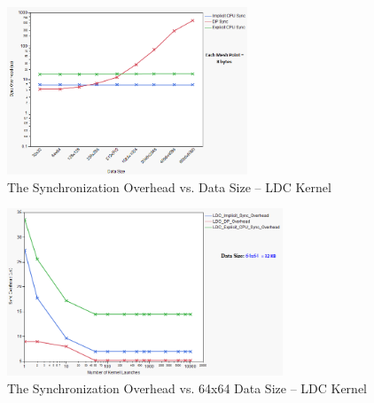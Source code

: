 \documentclass[conference]{IEEEtran}
\begin{document}
\begin{figure}
	\includegraphics[width=1.0\columnwidth, height=5cm]{data_size_vs_sync_overhead.png}
	\caption{The Synchronization Overhead vs. Data Size -- LDC Kernel}
	\label{fig:sync_vs_data_size}
\end{figure}
\begin{figure}
	\includegraphics[width=1.0\columnwidth, height=5cm]{ldc_sync_log_64x64.png}
	\caption{The Synchronization Overhead vs. 64x64 Data Size -- LDC Kernel}
	\label{fig:sync_vs_data_size_64x64}
\end{figure}


\end{document}
